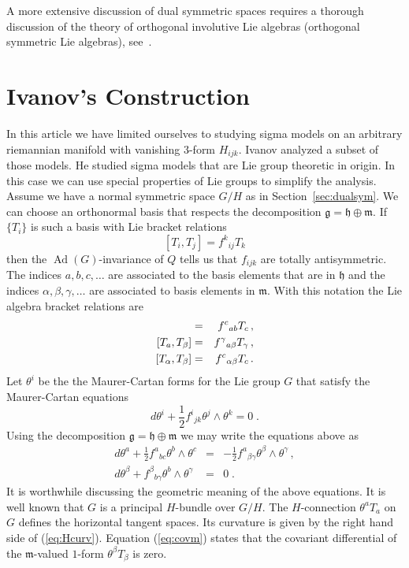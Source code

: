 \documentclass[a4paper,12pt]{article}
\DeclareMathOperator{\Ad}{Ad}
\newcommand{\lieg}{\mathfrak{g}}
\newcommand{\lieh}{\mathfrak{h}}
\newcommand{\liem}{\mathfrak{m}}
\newcommand{\half}{\frac{1}{2}}
\begin{document}
A more extensive discussion of dual symmetric spaces requires a 
thorough discussion of the theory of orthogonal involutive Lie 
algebras (orthogonal symmetric Lie algebras), 
see~\cite{Helgason:DG,Wolf:CC}.

\section{Ivanov's Construction}
\label{sec:ivanov}


In this article we have limited ourselves to studying sigma models on
an arbitrary riemannian manifold with vanishing $3$-form $H_{ijk}$. 
Ivanov analyzed  a subset of those models.  He studied sigma models
that are Lie group theoretic in origin.  In this case we can use
special properties of Lie groups to simplify the analysis.  Assume we
have a normal symmetric space $G/H$ as in Section~\ref{sec:dualsym}. 
We can choose an orthonormal basis that respects the decomposition
$\lieg = \lieh \oplus \liem$.  If $\{T_{i}\}$ is such a basis with Lie
bracket relations
$$
    [T_{i}, T_{j}] = f^{k}{}_{ij}T_{k}
$$
then the $\Ad(G)$-invariance of $Q$ tells us that $f_{ijk}$ are 
totally antisymmetric. The indices $a,b,c,\ldots$ are associated to  
the basis elements that are in  $\lieh$ and the indices 
$\alpha,\beta,\gamma,\ldots$ are associated to basis elements in 
$\liem$. With this notation the Lie algebra bracket relations are
\begin{eqnarray}
    [T_{a},T_{b}] & = & f^{c}{}_{ab}T_{c}\,,
    \label{eq:hhh}  \\ \relax
    [T_{a},T_{\beta}] & = & f^{\gamma}{}_{a\beta}T_{\gamma}\,,
    \label{eq:hmm}  \\ \relax
    [T_{\alpha},T_{\beta}] & = & f^{c}{}_{\alpha\beta}T_{c}\,.
    \label{eq:mmh}
\end{eqnarray}
Let $\theta^{i}$ be the the Maurer-Cartan forms for the Lie group $G$ 
that satisfy the Maurer-Cartan equations
$$
    d\theta^{i} + \half f^{i}{}_{jk}\theta^{j}\wedge\theta^{k}
    =0\;.
$$
Using the decomposition $\lieg=\lieh\oplus\liem$ we may write the 
equations above as
\begin{eqnarray}
    d\theta^{a} + \half f^{a}{}_{bc}\theta^{b}\wedge \theta^{c}
    & = & - \half f^{a}{}_{\beta\gamma} 
    \theta^{\beta}\wedge\theta^{\gamma}\,,
    \label{eq:Hcurv}  \\
    d\theta^{\beta} + f^{\beta}{}_{b\gamma} 
    \theta^{b}\wedge\theta^{\gamma} & = & 0\;.
    \label{eq:covm}
\end{eqnarray}
It is worthwhile discussing the geometric meaning of the above
equations.  It is well known that $G$ is a principal $H$-bundle over
$G/H$.  The $H$-connection $\theta^{a}T_{a}$ on $G$ defines the
horizontal tangent spaces.  Its curvature is given by the right hand
side of (\ref{eq:Hcurv}).  Equation (\ref{eq:covm}) states that the
covariant differential of the $\liem$-valued $1$-form
$\theta^{\beta}T_{\beta}$ is zero.
\end{document}
